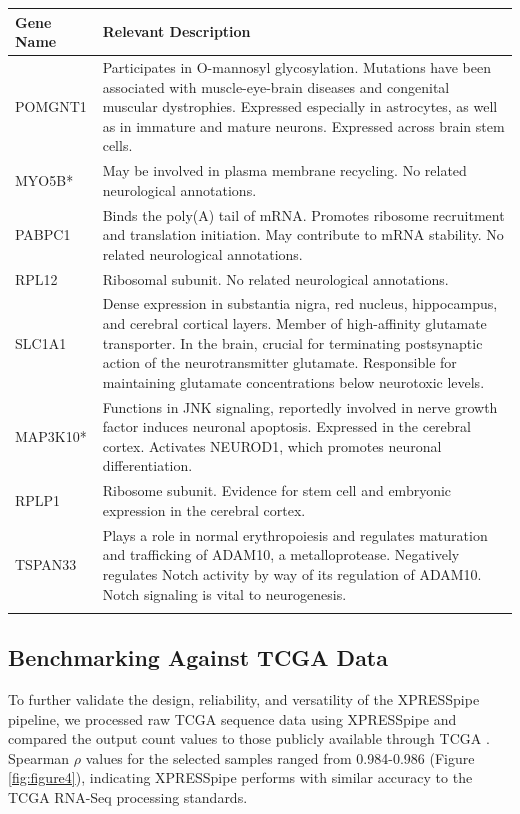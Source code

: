 \documentclass[10pt, oneside]{article}
\begin{document}
\begin{multicols}{2}
\begin{table}[!]
    \centering
{}
\begin{tabular}{p{2.5cm}p{15.5cm}}
 \textbf{Gene Name} & \textbf{Relevant Description} \\
 \hline
 POMGNT1 & Participates in O-mannosyl glycosylation. Mutations have been associated with muscle-eye-brain diseases and congenital muscular dystrophies. Expressed especially in astrocytes, as well as in immature and mature neurons. Expressed across brain stem cells. \\
 \hline
 MYO5B* & May be involved in plasma membrane recycling. No related neurological annotations. \\
 \hline
 PABPC1 & Binds the poly(A) tail of mRNA. Promotes ribosome recruitment and translation initiation. May contribute to mRNA stability. No related neurological annotations. \\
 \hline
 RPL12 & Ribosomal subunit. No related neurological annotations. \\
 \hline
 SLC1A1 & Dense expression in substantia nigra, red nucleus, hippocampus, and cerebral cortical layers. Member of high-affinity glutamate transporter. In the brain, crucial for terminating postsynaptic action of the neurotransmitter glutamate. Responsible for maintaining glutamate concentrations below neurotoxic levels. \\
 \hline
 MAP3K10* & Functions in JNK signaling, reportedly involved in nerve growth factor induces neuronal apoptosis. Expressed in the cerebral cortex. Activates NEUROD1, which promotes neuronal differentiation. \\
 \hline
 RPLP1 & Ribosome subunit. Evidence for stem cell and embryonic expression in the cerebral cortex. \\
 \hline
 TSPAN33 & Plays a role in normal erythropoiesis and regulates maturation and trafficking of ADAM10, a metalloprotease. Negatively regulates Notch activity by way of its regulation of ADAM10. Notch signaling is vital to neurogenesis. \\
 \label{tab:targets}
\end{tabular}
\end{table}


\subsection*{Benchmarking Against TCGA Data}
To further validate the design, reliability, and versatility of the XPRESSpipe pipeline, we processed raw TCGA sequence data using XPRESSpipe and compared the output count values to those publicly available through TCGA \cite{tcga}. Spearman $\rho$ values for the selected samples ranged from 0.984-0.986 (Figure \ref{fig:figure4}), indicating XPRESSpipe performs with similar accuracy to the TCGA RNA-Seq processing standards. \par


\end{multicols}
\end{document}
